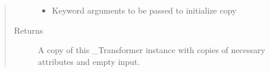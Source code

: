 \documentclass[letterpaper,10pt,english]{sphinxmanual}
\begin{document}
\begin{fulllineitems}
\begin{fulllineitems}
\begin{quote}
\begin{description}
\begin{itemize}
\item {} 
 \textendash{} Keyword arguments to be passed to initialize copy

\end{itemize}

\item[{Returns}] \leavevmode
A copy of this \_Transformer instance with copies of necessary
attributes and empty input.

\end{description}\end{quote}

\end{fulllineitems}


\end{fulllineitems}

\end{document}
